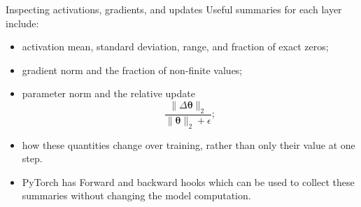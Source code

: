 
\begin{frame}{Inspecting activations, gradients, and updates}
Useful summaries for each layer include:
\begin{itemize}
  \item activation mean, standard deviation, range, and fraction of exact zeros;
  \item gradient norm and the fraction of non-finite values;
  \item parameter norm and the relative update
  \[
    \frac{\lVert\Delta\bm\theta\rVert_2}
         {\lVert\bm\theta\rVert_2+\epsilon};
  \]
  \item how these quantities change over training, rather than only their value at one step.
\end{itemize}

\begin{itemize}
  \item PyTorch has Forward and backward hooks which can be used to collect these summaries without changing the model computation.
\end{itemize}
\end{frame}


